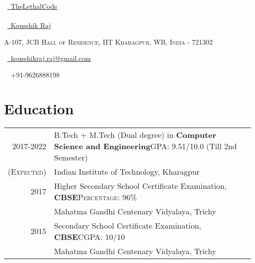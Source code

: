 \documentclass[a4paper,10pt]{extarticle} %
\begin{document}
\pagestyle{empty} %

\begin{multicols}{3}

\normalsize \faGithub\ {\href{https://github.com/TheLethalCode}{\  TheLethalCode}}\\
\normalsize {}\\
\normalsize  \faLinkedinSquare\ {\href{https://www.linkedin.com/in/kousshik-raj-murali-b3976916a/}{\  Kousshik Raj}}\\
\columnbreak
\normalsize\par{\par} %
\par{\centering\normalsize {\textsc{A-107, JCB Hall of Residence, IIT Kharagpur, WB, India - 721302}}\hfill\par}
\columnbreak
\raggedright\hfill\normalsize \faEnvelope\ {\href{mailto:kousshikraj.raj@gmail.com}{\  kousshikraj.raj@gmail.com}}\\
\raggedright\hfill{\faPhone\ \  +91-9626888198}
\end{multicols}


\vspace{-0.4cm}
\section{\textcolor{primary}{Education}}

\begin{tabular}{r|p{17.5cm}}	
2017-2022 & B.Tech + M.Tech (Dual degree) in \textbf{Computer Science and Engineering}\hfill\textsc{GPA: } 9.51/10.0 (Till 2nd Semester)\\
\textsc{(Expected)}& Indian Institute of Technology, Kharagpur \hfill\\
2017 & Higher Secondary School Certificate Examination, \textbf{CBSE}\hfill\textsc{Percentage: } 96\% \\
& Mahatma Gandhi Centenary Vidyalaya, Trichy \hfill\\
2015 & Secondary School Certificate Examination, \textbf{CBSE}\hfill\textsc{CGPA: } 10/10 \\
& Mahatma Gandhi Centenary Vidyalaya, Trichy \hfill\\
\end{tabular}
\end{document}

